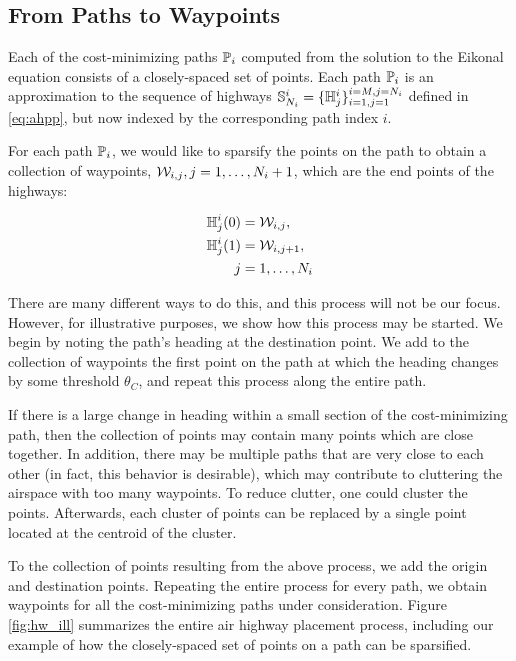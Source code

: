 \subsection{From Paths to Waypoints}
Each of the cost-minimizing paths $\mathbb{P}_i$ computed from the solution to the Eikonal equation consists of a closely-spaced set of points. Each path $\mathbb{P}_i$ is an approximation to the sequence of highways $\mathbb{S}_{N_i}^i = \{\mathbb{H}^i_j\}_{i=1,j=1}^{i=M,j=N_i}$ defined in \eqref{eq:ahpp}, but now indexed by the corresponding path index $i$. 

For each path $\mathbb{P}_i$, we would like to sparsify the points on the path to obtain a collection of waypoints, $\mathcal{W}_{i,j}, j = 1,\ldots, N_i+1$, which are the end points of the highways:

\begin{equation}
\begin{aligned}
\mathbb{H}^i_j(0) &= \mathcal{W}_{i,j}, \\
\mathbb{H}^i_j(1) &= \mathcal{W}_{i,j+1}, \\
j &= 1,\ldots,N_i
\end{aligned}
\end{equation}

There are many different ways to do this, and this process will not be our focus. However, for illustrative purposes, we show how this process may be started. We begin by noting the path's heading at the destination point. We add to the collection of waypoints the first point on the path at which the heading changes by some threshold $\theta_C$, and repeat this process along the entire path.

If there is a large change in heading within a small section of the cost-minimizing path, then the collection of points may contain many points which are close together. In addition, there may be multiple paths that are very close to each other (in fact, this behavior is desirable), which may contribute to cluttering the airspace with too many waypoints. To reduce clutter, one could cluster the points. Afterwards, each cluster of points can be replaced by a single point located at the centroid of the cluster. 

To the collection of points resulting from the above process, we add the origin and destination points. Repeating the entire process for every path, we obtain waypoints for all the cost-minimizing paths under consideration. Figure \ref{fig:hw_ill} summarizes the entire air highway placement process, including our example of how the closely-spaced set of points on a path can be sparsified.